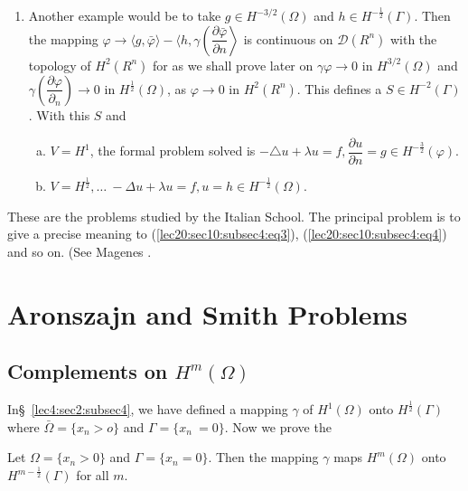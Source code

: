 \begin{enumerate}[1)]
\begin{enumerate}[a)]
  \end{enumerate}
\item Another example would be to take $g \in H^{-3/2}
  (\Omega)$ and $h \in H^{-\frac{1}{2}} (\Gamma)$. Then the
  mapping $\varphi \to \langle g, \bar{\varphi} \rangle - \langle h,
  \gamma \left(\dfrac{\partial \bar{\varphi}}{\partial n}\right \rangle$ is
  continuous on $\mathscr{D} (R^n)$ with the topology of $H^2 (R^n)$
  for as we shall prove later on $\gamma \varphi \to 0$ in $H^{3/2}
  (\Omega)$ and $\gamma \left(\dfrac{\partial \varphi}{\partial_n}\right) \to 0$
  in $H^{\frac{1}{2}} (\Omega)$, as $\varphi \to 0$ in $H^2
  (R^n)$. This defines a $S \in H^{-2} (\Gamma)$. With this
  $S$ and  
\begin{enumerate}[a)]
\item $V = H^1$, the formal problem solved is $- \triangle u + \lambda
  u = f, \dfrac{\partial u}{\partial n} = g \in
  H^{-\frac{3}{2}} (\varphi)$.  
\item $V = H^{\frac{1}{2}}, \ldots ~ - \Delta u + \lambda u = f, u =
  h \in H^{-\frac{1}{2}}(\Omega)$.  
\end{enumerate}
\end{enumerate} 

These are the problems studied by the Italian School. The principal
problem is to give a precise meaning to (\ref{lec20:sec10:subsec4:eq3}), (\ref{lec20:sec10:subsec4:eq4}) and so on. (See
Magenes \cite{k11}.  

\section{Aronszajn and Smith Problems\texorpdfstring{\protect\footnotemark[1]}{1}}\label{lec20:sec11}


\subsection{Complements on \texorpdfstring{$H^m (\Omega)$}{Hm(Omega)}}\label{lec20:sec11:subsec1}

In\pageoriginale \S\ \ref{lec4:sec2:subsec4}, we have defined a mapping $\gamma$ of $H^1 (\Omega)$
onto $H^{\frac{1}{2}} (\Gamma)$ where $\bar{\Omega}= \{ x_n > o \}$ and
$\Gamma = \{x_n ~ = 0\}$. Now we prove the 
\begin{proposition}\label{lec20:sec11:subsec1:prop11.1} %
  Let $\Omega = \{ x_n > 0 \}$ and $\Gamma = \{ x_n = 0 \}$. Then the
  mapping $\gamma$ maps $H^m (\Omega)$ onto $H^{m - \frac{1}{2}}
  (\Gamma)$ for all $m$.  
\end{proposition}

